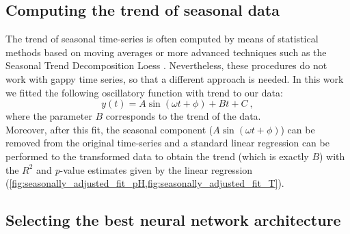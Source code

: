 \subsection{Computing the trend of seasonal data}

The trend of seasonal time-series is often computed by means of statistical
methods based on moving averages or more advanced techniques such as the
Seasonal Trend Decomposition Loess \cite{cleveland1990stl}. Nevertheless, these
procedures do not work with gappy time series, so that a different approach is
needed. In this work we fitted the following oscillatory function with trend to
our data:
\begin{equation}\label{eq:seasonal_fit}
    y(t)=A\sin(\omega t+\phi)+Bt+C \ ,
\end{equation}
where the parameter $B$ corresponds to the trend of the data.\\
Moreover, after this fit, the seasonal component ($A\sin(\omega t + \phi)$)
can be removed from the original time-series and a standard linear regression
can be performed to the transformed data to obtain the trend (which is exactly
$B$) with the $R^2$ and \emph{p}-value estimates given by the linear regression
(\cref{fig:seasonally_adjusted_fit_pH,fig:seasonally_adjusted_fit_T}).

\subsection{Selecting the best neural network architecture}


